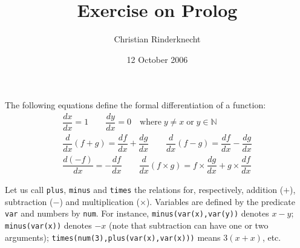 \documentclass[11pt,a4paper]{article}
\title{Exercise on Prolog}
\author{Christian Rinderknecht}
\date{12 October 2006}
\begin{document}
\maketitle
\thispagestyle{empty}

\noindent The following equations define the formal differentiation of
a function:
\begin{gather*}
\dfrac{dx}{dx}    = 1 \qquad
\dfrac{dy}{dx}    = 0 \quad \text{where} \;y \neq x\; \text{or}\;
                            y \in\mathbb{N}\\
\dfrac{d}{dx}(f + g) = \dfrac{df}{dx} + \dfrac{dg}{dx}
\qquad
\dfrac{d}{dx}(f - g) = \dfrac{df}{dx} - \dfrac{dg}{dx}\\
\dfrac{d(-f)}{dx} = -{\dfrac{df}{dx}}
\qquad
\dfrac{d}{dx}(f \times g) = f \times {\dfrac{dg}{dx}} +
g \times {\dfrac{df}{dx}}
\end{gather*}

\noindent Let us call \texttt{plus}, \texttt{minus} and \texttt{times}
the relations for, respectively, addition (\(+\)), subtraction
(\(-\)) and multiplication (\(\times\)). Variables are defined by the
predicate \texttt{var} and numbers by \texttt{num}. For instance,
\texttt{minus(var(x),var(y))} denotes \(x-y\); \texttt{minus(var(x))}
denotes \(-x\) (note that subtraction can have one or two arguments);
\texttt{times(num(3),plus(var(x),var(x)))} means \(3(x + x)\), etc.





\end{document}
